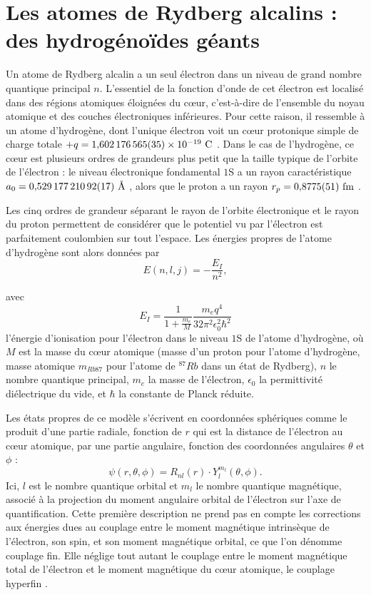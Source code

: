 \section{Les atomes de Rydberg alcalins : des hydrogénoïdes géants}
\noindent Un atome de Rydberg alcalin a un seul électron dans un niveau de grand nombre quantique principal $n$. L'essentiel de la fonction d'onde de cet électron est localisé dans des régions atomiques éloignées du c\oe ur, c'est-à-dire de l'ensemble du noyau atomique et des couches électroniques inférieures.
Pour cette raison, il ressemble à un atome d'hydrogène, dont l'unique électron voit un c\oe ur protonique simple de charge totale $+q=\numv{1.602176565(35)d-19}\si{\coulomb}$ \cite{MX_CODATA14}.
Dans le cas de l'hydrogène, ce c\oe ur est plusieurs ordres de grandeurs plus petit que la taille typique de l'orbite de l'électron : le niveau électronique fondamental $1$S a un \og rayon \fg{} caractéristique $a_0 = \numv{0,52917721092(17)}\si{\angstrom}$ \cite{MX_CODATA14}, alors que le proton a un rayon $r_p = \numv{0.8775(51)}\si{\femto\meter}$ \cite{MX_CODATA14}.

Les cinq ordres de grandeur séparant le rayon de l'orbite électronique et le rayon du proton permettent de considérer que le potentiel vu par l'électron est parfaitement coulombien sur tout l'espace.
Les énergies propres de l'atome d'hydrogène sont alors données par
\begin{equation}\label{eq:Hatom}
E(n,l,j)= - \frac{E_I}{n^2} ,
\end{equation}

avec
\begin{equation}\label{eq:E_I}
E_I = \frac{1}{1+\frac{m_e}{M}}\frac{m_e q^4}{32\pi^2 \epsilon _0^2 \hbar ^2}
\end{equation}
l'énergie d'ionisation pour l'électron dans le niveau $1$S de l'atome d'hydrogène, où $M$ est la masse du c\oe ur atomique (masse d'un proton pour l'atome d'hydrogène, masse atomique $m_{Rb87}$ pour l'atome de $^{87}Rb$ dans un état de Rydberg), $n$ le nombre quantique principal, $m_e$ la masse de l'électron, $\epsilon_0$ la permittivité diélectrique du vide, et $\hbar$ la constante de Planck réduite.

Les états propres de ce modèle s'écrivent en coordonnées sphériques comme le produit d'une partie radiale, fonction de $r$ qui est la distance de l'électron au c\oe ur atomique, par une partie angulaire, fonction des coordonnées angulaires $\theta$ et $\phi$ \cite{TXT_COHEN1FR} : 
\begin{equation}\label{eq:Hfonctonde}
\psi(r,\theta,\phi) = R_{nl}(r)\cdot Y_l^{m_l}(\theta,\phi).
\end{equation}
Ici, $l$ est le nombre quantique orbital et $m_l$ le nombre quantique magnétique, associé à la projection du moment angulaire orbital de l'électron sur l'axe de quantification.
Cette première description ne prend pas en compte les corrections aux énergies dues au couplage entre le moment magnétique intrinsèque de l'électron, son spin, et son moment magnétique orbital, ce que l'on dénomme couplage fin.
Elle néglige tout autant le couplage entre le moment magnétique total de l'électron et le moment magnétique du c\oe ur atomique, le couplage hyperfin \cite{TXT_COHEN2FR}.

